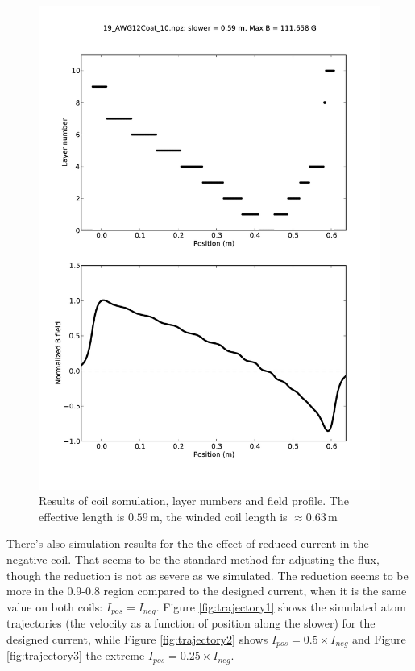 \documentclass[12pt,a4paper]{article}
\newcommand{\unit}[1]{\ensuremath{\, \mathrm{#1}}}
\begin{document}
\begin{figure}[htb]
\centering
\includegraphics[width=1.0\textwidth]{19_AWG12Coat_10}
\caption{Results of coil somulation, layer numbers and field profile. The effective length is $0.59\unit{m}$, the winded coil length is $\approx0.63\unit{m}$ }
\label{fig:simcoil}
\end{figure}

There's also simulation results for the the effect of reduced current in the negative coil. That seems to be the standard method for adjusting the flux, though the reduction is not as severe as we simulated. The reduction seems to be more in the 0.9-0.8 region compared to the designed current, when it is the same value on both coils: $I_{pos} = I_{neg}$. Figure \ref{fig:trajectory1} shows the simulated atom trajectories (the velocity as a function of position along the slower) for the designed current, while Figure \ref{fig:trajectory2} shows $I_{pos} = 0.5 \times I_{neg}$ and Figure \ref{fig:trajectory3} the extreme $I_{pos} = 0.25 \times I_{neg}$.
\end{document}
